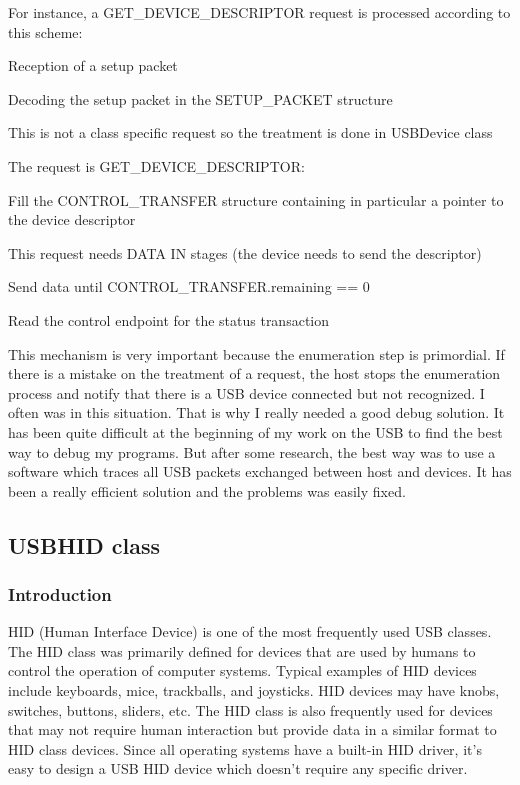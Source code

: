\documentclass[pdftex,10pt,a4paper]{report}
\newenvironment{packed_item}{
\begin{itemize}
  \setlength{\itemsep}{1pt}
  \setlength{\parskip}{0pt}
  \setlength{\parsep}{0pt}
}{\end{itemize}}
\begin{document}
For instance, a GET\_DEVICE\_DESCRIPTOR request is processed according to this scheme:
\begin{packed_item}
	\item Reception of a setup packet
	\item Decoding the setup packet in the SETUP\_PACKET structure
	\item This is not a class specific request so the treatment is done in USBDevice class
	\item The request is GET\_DEVICE\_DESCRIPTOR:
	\begin{packed_item}
		\item Fill the CONTROL\_TRANSFER structure containing in particular a pointer to the device descriptor
		\item This request needs DATA IN stages (the device needs to send the descriptor)
		\item Send data until CONTROL\_TRANSFER.remaining == 0
		\item Read the control endpoint for the status transaction
	\end{packed_item}
\end{packed_item}

This mechanism is very important because the enumeration step is primordial. If there is a mistake on the treatment of a request, the host stops the enumeration process and notify that there is a USB device connected but not recognized. I often was in this situation. That is why I really needed a good debug solution. It has been quite difficult at the beginning of my work on the USB to find the best way to debug my programs. But after some research, the best way was to use a software which traces all USB packets exchanged between host and devices. It has been a really efficient solution and the problems was easily fixed.


\subsection{USBHID class}
\subsubsection{Introduction}
HID (Human Interface Device) is one of the most frequently used USB classes. The HID class was primarily defined for devices that are used by humans to control the operation of computer systems. Typical examples of HID devices include keyboards, mice, trackballs, and joysticks. HID devices may have knobs, switches, buttons, sliders, etc. The HID class is also frequently used for devices that may not require human interaction but provide data in a similar format to HID class devices. Since all operating systems have a built-in HID driver, it's easy to design a USB HID device which doesn't require any specific driver. \\
\end{document}
